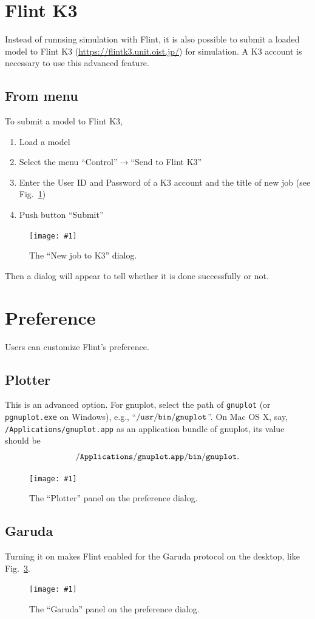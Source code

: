 \documentclass[a4paper,10pt]{report}
\newcommand\FigureOfImage[2]{\begin{figure}[h]
  \centering
  \texttt{[image: \#1]}
  \caption{#2}\label{fig:#1}
\end{figure}}
\begin{document}
\section{Flint K3}
Instead of runnsing simulation with Flint, it is also possible to submit a loaded
model to Flint K3 (\url{https://flintk3.unit.oist.jp/}) for simulation.
A K3 account is necessary to use this advanced feature.

\subsection{From menu}
To submit a model to Flint K3,
\begin{enumerate}
\item Load a model
\item Select the menu ``Control''$\rightarrow$``Send to Flint K3''
\item Enter the User ID and Password of a K3 account and the title of new job
  (see Fig.~\ref{fig:new-job-to-k3})
\item Push button ``Submit''
\end{enumerate}
\FigureOfImage{new-job-to-k3}{The ``New job to K3'' dialog.}
Then a dialog will appear to tell whether it is done successfully or not.

\section{Preference}
\label{sec:preference}
Users can customize Flint's preference.

\subsection{Plotter}
This is an advanced option.
For gnuplot, select the path of {\tt gnuplot} (or {\tt pgnuplot.exe} on Windows),
e.g., ``$\tt{/usr/bin/gnuplot}$''. On Mac OS X, say,
{\tt /Applications/gnuplot.app} as an application bundle of gnuplot, its value
should be \[{\tt /Applications/gnuplot.app/bin/gnuplot}.\]
\FigureOfImage{preference-plotter}{The ``Plotter'' panel on the preference dialog.}

\subsection{Garuda}
\label{subsec:Garuda}
Turning it on makes Flint enabled for the Garuda protocol on the desktop, like
Fig.~\ref{fig:preference-garuda}.
\FigureOfImage{preference-garuda}{The ``Garuda'' panel on the preference dialog.}
\end{document}
